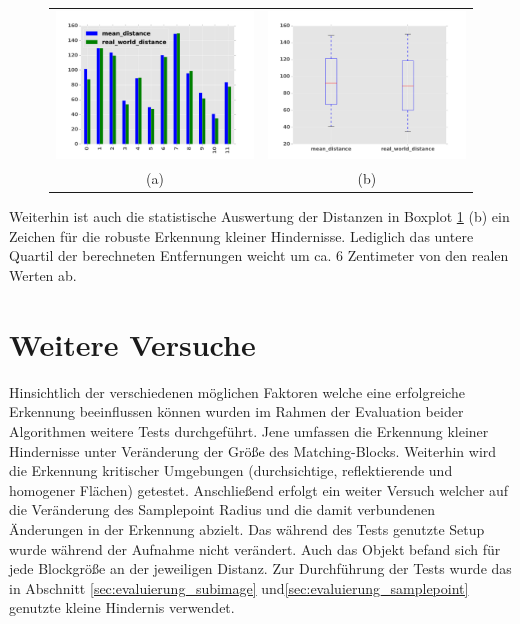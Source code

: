 \begin{figure}[h]
	\centering
	\begin{tabular}{cc}
	\includegraphics[width=7cm]{img/evaluation/diagrams/sample_tiny_bar}&
	\includegraphics[width=7cm]{img/evaluation/diagrams/sample_tiny_box}\\
	 (a) & (b)
	\end{tabular}
	\caption{}
    \label{fig:sample_eval_tiny}
\end{figure}

\noindent
Weiterhin ist auch die statistische Auswertung der Distanzen in Boxplot \ref{fig:sample_eval_tiny} (b) ein Zeichen für die robuste Erkennung kleiner Hindernisse. Lediglich das untere Quartil der berechneten Entfernungen weicht um ca. 6 Zentimeter von den realen Werten ab.

\section{Weitere Versuche}
\label{sec:further_tests}

Hinsichtlich der verschiedenen möglichen Faktoren welche eine erfolgreiche Erkennung beeinflussen können wurden im Rahmen der Evaluation beider Algorithmen weitere Tests durchgeführt. Jene umfassen die Erkennung kleiner Hindernisse unter Veränderung der Größe des Matching-Blocks. Weiterhin wird die Erkennung kritischer Umgebungen (durchsichtige, reflektierende und homogener Flächen) getestet. Anschließend erfolgt ein weiter Versuch welcher auf die Veränderung des Samplepoint Radius und die damit verbundenen Änderungen in der Erkennung abzielt. Das während des Tests genutzte Setup wurde während der Aufnahme nicht verändert. Auch das Objekt befand sich für jede Blockgröße an der jeweiligen Distanz. Zur Durchführung der Tests wurde das in Abschnitt \ref{sec:evaluierung_subimage} und\ref{sec:evaluierung_samplepoint} genutzte kleine Hindernis verwendet.

